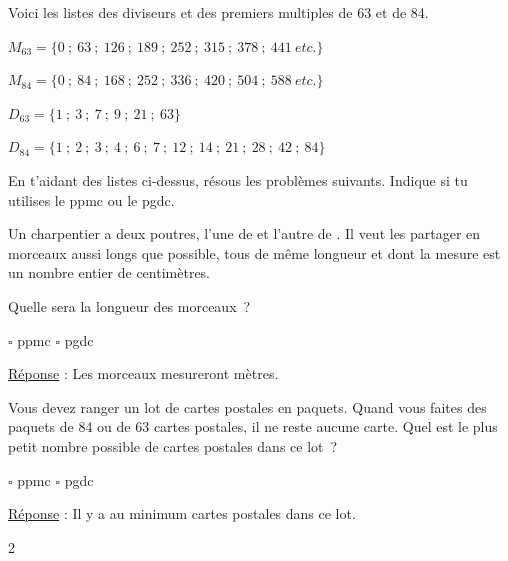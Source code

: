 \documentclass[a4paper,11pt]{report}
\begin{document}
\begin{exo}{
    Voici les listes des diviseurs et des premiers multiples de 63 et de 84.  
    
    \hspace*{1cm} $M_{63}=\{0~;~63~;~126~;~189~;~252~;~315~;~378~;~441~etc.\}$ 

    \hspace*{1cm} $M_{84}=\{0~;~84~;~168~;~252~;~336~;~420~;~504~;~588~etc.\}$ 

    \hspace*{1cm} $D_{63}=\{1~;~3~;~7~;~9~;~21~;~63\}$

    \hspace*{1cm} $D_{84}=\{1~;~2~;~3~;~4~;~6~;~7~;~12~;~14~;~21~;~28~;~42~;~84\}$ 

    En t'aidant des listes ci-dessus, résous les problèmes suivants. Indique si tu utilises le ppmc ou le pgdc.
    
    \begin{tasks}[label-width = 1em ,item-indent = 2em ,before-skip = -0.4em, after-skip = -0.4em , label-offset=0.666em,after-item-skip = 0.3em]
	    \task Un charpentier a deux poutres, l'une de  et l'autre de . Il veut les partager en morceaux aussi longs que possible, tous de même longueur et dont la mesure est un nombre entier de centimètres.

		    Quelle sera la longueur des morceaux~?
        \begin{center}  $\square$ ppmc \hspace*{2cm} $\square$ pgdc     \end{center}
        \underline{Réponse} : Les morceaux mesureront  mètres. 

    
        \task Vous devez ranger un lot de cartes postales en paquets.  Quand vous faites des paquets de 84 ou de 63 cartes postales, il ne reste aucune carte.  Quel est le plus petit nombre possible de cartes postales dans ce lot~?
        \begin{center}  $\square$ ppmc \hspace*{2cm} $\square$ pgdc     \end{center}
        \underline{Réponse} : Il y a au minimum  cartes postales dans ce lot.

    \end{tasks} 
}{2}\end{exo}
\end{document}
